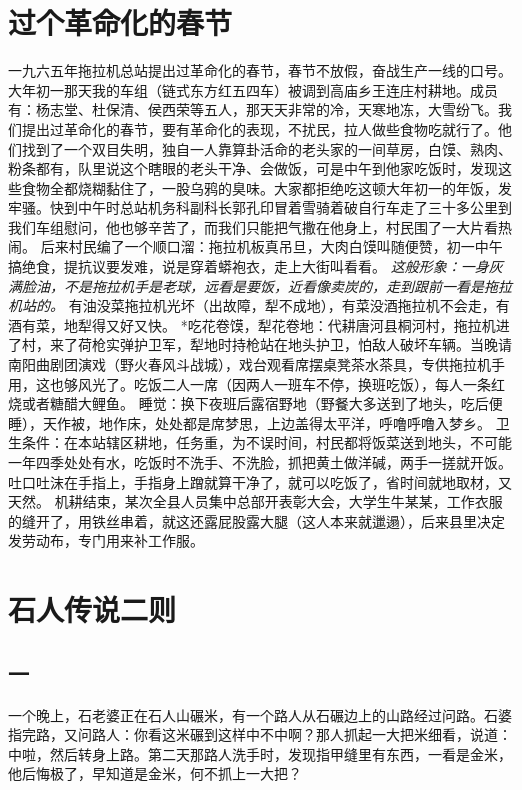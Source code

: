 \section*{过个革命化的春节}

一九六五年拖拉机总站提出过革命化的春节，春节不放假，奋战生产一线的口号。大年初一那天我的车组（链式东方红五四车）被调到高庙乡王连庄村耕地。成员有：杨志堂、杜保清、侯西荣等五人，那天天非常的冷，天寒地冻，大雪纷飞。我们提出过革命化的春节，要有革命化的表现，不扰民，拉人做些食物吃就行了。他们找到了一个双目失明，独自一人靠算卦活命的老头家的一间草房，白馍、熟肉、粉条都有，队里说这个瞎眼的老头干净、会做饭，可是中午到他家吃饭时，发现这些食物全都烧糊黏住了，一股乌鸦的臭味。大家都拒绝吃这顿大年初一的年饭，发牢骚。快到中午时总站机务科副科长郭孔印冒着雪骑着破自行车走了三十多公里到我们车组慰问，他也够辛苦了，而我们只能把气撒在他身上，村民围了一大片看热闹。 后来村民编了一个顺口溜：拖拉机板真吊旦，大肉白馍叫随便赞，初一中午搞绝食，提抗议要发难，说是穿着蟒袍衣，走上大街叫看看。 \textit{这般形象：一身灰满脸油，不是拖拉机手是老球，远看是要饭，近看像卖炭的，走到跟前一看是拖拉机站的。 }有油没菜拖拉机光坏（出故障，犁不成地），有菜没酒拖拉机不会走，有酒有菜，地犁得又好又快。 *吃花卷馍，犁花卷地：代耕唐河县桐河村，拖拉机进了村，来了荷枪实弹护卫军，犁地时持枪站在地头护卫，怕敌人破坏车辆。当晚请南阳曲剧团演戏（野火春风斗战城），戏台观看席摆桌凳茶水茶具，专供拖拉机手用，这也够风光了。吃饭二人一席（因两人一班车不停，换班吃饭），每人一条红烧或者糖醋大鲤鱼。 睡觉：换下夜班后露宿野地（野餐大多送到了地头，吃后便睡），天作被，地作床，处处都是席梦思，上边盖得太平洋，呼噜呼噜入梦乡。 卫生条件：在本站辖区耕地，任务重，为不误时间，村民都将饭菜送到地头，不可能一年四季处处有水，吃饭时不洗手、不洗脸，抓把黄土做洋碱，两手一搓就开饭。吐口吐沫在手指上，手指身上蹭就算干净了，就可以吃饭了，省时间就地取材，又天然。 机耕结束，某次全县人员集中总部开表彰大会，大学生牛某某，工作衣服的缝开了，用铁丝串着，就这还露屁股露大腿（这人本来就邋遢），后来县里决定发劳动布，专门用来补工作服。


\section*{石人传说二则}


\subsection*{一}

一个晚上，石老婆正在石人山碾米，有一个路人从石碾边上的山路经过问路。石婆指完路，又问路人：你看这米碾到这样中不中啊？那人抓起一大把米细看，说道：中啦，然后转身上路。第二天那路人洗手时，发现指甲缝里有东西，一看是金米，他后悔极了，早知道是金米，何不抓上一大把？


